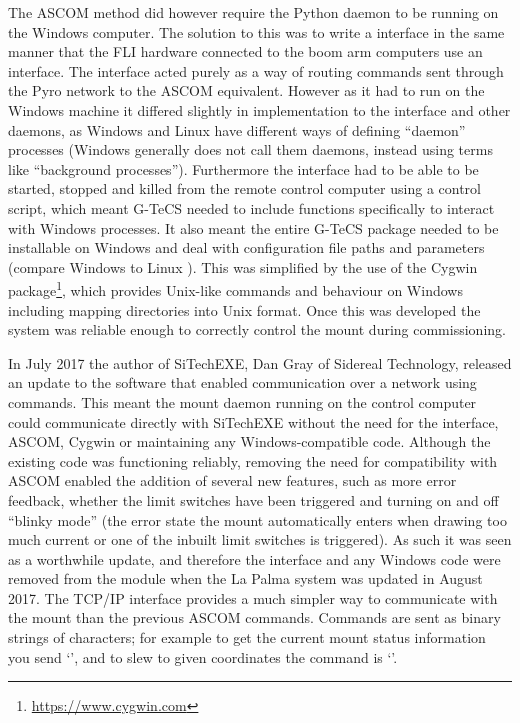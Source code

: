 \begin{colsection}
\begin{colsection}
The ASCOM method did however require the Python daemon to be running on the Windows computer. The solution to this was to write a  interface in the same manner that the FLI hardware connected to the boom arm computers use an  interface. The  interface acted purely as a way of routing commands sent through the Pyro network to the ASCOM equivalent. However as it had to run on the Windows machine it differed slightly in implementation to the  interface and other daemons, as Windows and Linux have different ways of defining ``daemon'' processes (Windows generally does not call them daemons, instead using terms like ``background processes''). Furthermore the interface had to be able to be started, stopped and killed from the remote control computer using a  control script, which meant G-TeCS needed to include functions specifically to interact with Windows processes. It also meant the entire G-TeCS package needed to be installable on Windows and deal with configuration file paths and parameters (compare Windows  to Linux ). This was simplified by the use of the Cygwin package\footnote{\url{https://www.cygwin.com}}, which provides Unix-like commands and behaviour on Windows including mapping directories into Unix format. Once this was developed the system was reliable enough to correctly control the mount during commissioning.

In July 2017 the author of SiTechEXE, Dan Gray of Sidereal Technology, released an update to the software that enabled communication over a network using  commands. This meant the mount daemon running on the control computer could communicate directly with SiTechEXE without the need for the  interface, ASCOM, Cygwin or maintaining any Windows-compatible code. Although the existing code was functioning reliably, removing the need for compatibility with ASCOM enabled the addition of several new features, such as more error feedback, whether the limit switches have been triggered and turning on and off ``blinky mode'' (the error state the mount automatically enters when drawing too much current or one of the inbuilt limit switches is triggered). As such it was seen as a worthwhile update, and therefore the  interface and any Windows code were removed from the  module when the La Palma system was updated in August 2017. The TCP/IP interface provides a much simpler way to communicate with the mount than the previous ASCOM commands. Commands are sent as binary strings of characters; for example to get the current mount status information you send `', and to slew to given coordinates the command is `'.


\end{colsection}
\end{colsection}
